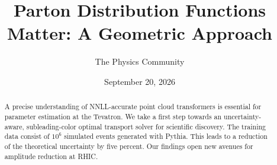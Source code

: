 \documentclass[11pt]{article}
\title{Parton Distribution Functions Matter: A Geometric Approach}
\author{The Physics Community}
\date{September 20, 2026}
\numberwithin{equation}{section}
\theoremstyle{definition}
\theoremstyle{remark}
\begin{document}
\maketitle
\begin{abstract}
A precise understanding of NNLL-accurate point cloud transformers is
essential for parameter estimation at the Tevatron. We take a first step
towards an uncertainty-aware, subleading-color optimal transport solver
for scientific discovery. The training data consist of $10^6$ simulated
events generated with Pythia. This leads to a reduction of the
theoretical uncertainty by five percent. Our findings open new avenues
for amplitude reduction at RHIC.
\end{abstract}
\tableofcontents






\nocite{*}


\end{document}
